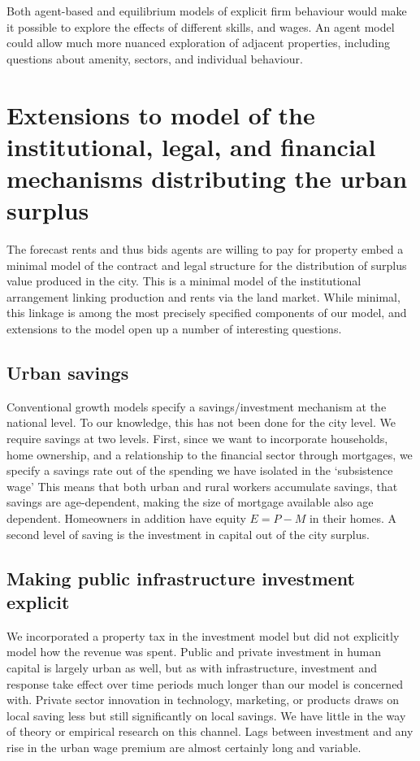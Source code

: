 Both agent-based and equilibrium models of explicit firm behaviour would make it possible to explore the effects of different skills, and wages. An agent model could allow much more nuanced exploration of adjacent properties, including questions about amenity, sectors, and individual behaviour. 

\section{Extensions to model of the institutional, legal, and financial mechanisms distributing the urban surplus}
The forecast rents and thus bids agents are willing to pay for property embed a minimal model of the contract and legal structure for the distribution of surplus value produced in the city. This is a minimal model of the institutional arrangement linking production and rents via the land market. While minimal, this linkage is among the most precisely specified components of our model, and extensions to the model open up a number of interesting questions. 


\subsection{Urban savings}
Conventional growth models specify a savings/investment mechanism at the national level. To our knowledge, this has not been done for the city level. We require savings at two levels. First, since we want to incorporate households, home ownership, and a relationship to the financial sector through mortgages, we specify a savings rate out of the spending we have isolated in the `subsistence wage' This means that both urban and rural workers accumulate savings, that savings are age-dependent, making the size of mortgage available also age dependent. 
Homeowners in addition have equity $E=P-M$ in their homes. %
{A second level of saving is the investment in capital out of the city surplus.} %

\subsection{Making public infrastructure investment explicit}
We incorporated a property tax in the investment model but did not explicitly model how the revenue was spent. Public and private investment in human capital is largely urban as well, but as with infrastructure, investment and response take effect over time periods much longer than our model is concerned with. Private sector innovation in technology, marketing, or products draws on local saving less but still significantly on local savings. We have little in the way of theory or empirical research on this channel. Lags between investment and any rise in the urban wage premium are almost certainly long and variable. 

